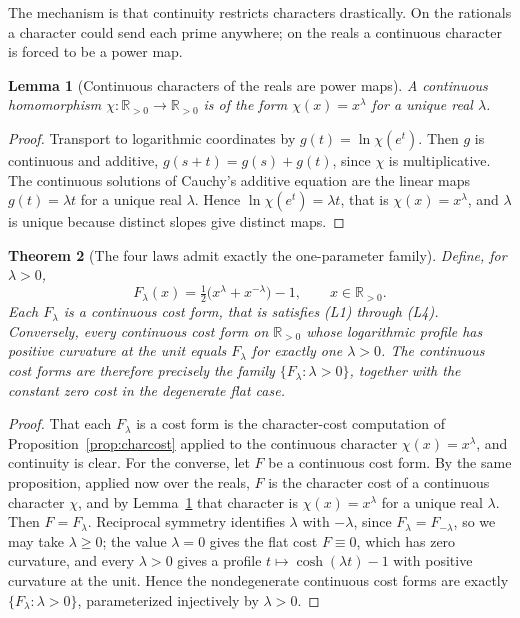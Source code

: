 \documentclass[11pt,a4paper]{article}
\newtheorem{theorem}{Theorem}[section]
\newtheorem{lemma}[theorem]{Lemma}
\theoremstyle{definition}
\theoremstyle{remark}
\newcommand{\Rpos}{\mathbb{R}_{>0}}
\newcommand{\costL}[1]{F_{#1}}
\begin{document}
The mechanism is that continuity restricts characters drastically. On the
rationals a character could send each prime anywhere; on the reals a continuous
character is forced to be a power map.

\begin{lemma}[Continuous characters of the reals are power maps]\label{lem:power}
A continuous homomorphism $\chi \colon \Rpos \to \Rpos$ is of the form
$\chi(x) = x^{\lambda}$ for a unique real $\lambda$.
\end{lemma}

\begin{proof}
Transport to logarithmic coordinates by $g(t) = \ln \chi(e^{t})$. Then $g$ is
continuous and additive, $g(s + t) = g(s) + g(t)$, since $\chi$ is multiplicative.
The continuous solutions of Cauchy's additive equation are the linear maps
$g(t) = \lambda t$ for a unique real $\lambda$. Hence
$\ln \chi(e^{t}) = \lambda t$, that is $\chi(x) = x^{\lambda}$, and $\lambda$ is
unique because distinct slopes give distinct maps.
\end{proof}

\begin{theorem}[The four laws admit exactly the one-parameter family]\label{thm:family}
Define, for $\lambda > 0$,
\[
  \costL{\lambda}(x) = \tfrac{1}{2}\bigl(x^{\lambda} + x^{-\lambda}\bigr) - 1 ,
  \qquad x \in \Rpos .
\]
Each $\costL{\lambda}$ is a continuous cost form, that is satisfies (L1) through
(L4). Conversely, every continuous cost form on $\Rpos$ whose logarithmic profile
has positive curvature at the unit equals $\costL{\lambda}$ for exactly one
$\lambda > 0$. The continuous cost forms are therefore precisely the family
$\{\costL{\lambda} : \lambda > 0\}$, together with the constant zero cost in the
degenerate flat case.
\end{theorem}

\begin{proof}
That each $\costL{\lambda}$ is a cost form is the character-cost computation of
Proposition~\ref{prop:charcost} applied to the continuous character
$\chi(x) = x^{\lambda}$, and continuity is clear. For the converse, let $F$ be a
continuous cost form. By the same proposition, applied now over the reals, $F$ is
the character cost of a continuous character $\chi$, and by Lemma~\ref{lem:power}
that character is $\chi(x) = x^{\lambda}$ for a unique real $\lambda$. Then
$F = \costL{\lambda}$. Reciprocal symmetry identifies $\lambda$ with $-\lambda$,
since $\costL{\lambda} = \costL{-\lambda}$, so we may take $\lambda \geq 0$; the
value $\lambda = 0$ gives the flat cost $F \equiv 0$, which has zero curvature,
and every $\lambda > 0$ gives a profile $t \mapsto \cosh(\lambda t) - 1$ with
positive curvature at the unit. Hence the nondegenerate continuous cost forms are
exactly $\{\costL{\lambda} : \lambda > 0\}$, parameterized injectively by
$\lambda > 0$.
\end{proof}
\end{document}
